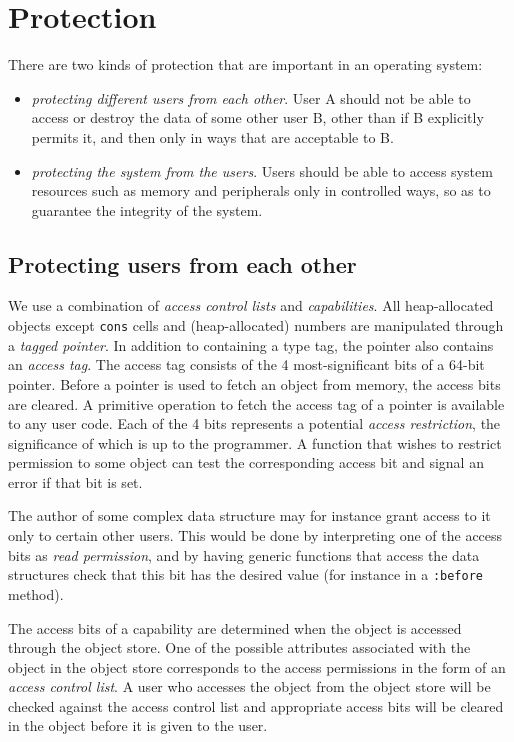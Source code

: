 \chapter{Protection}
\label{chap-protection}

There are two kinds of protection that are important in an operating
system:

\begin{itemize}
\item \emph{protecting different users from each other}.  User A
  should not be able to access or destroy the data of some other user
  B, other than if B explicitly permits it, and then only in ways that
  are acceptable to B.
\item \emph{protecting the system from the users}.  Users should be
  able to access system resources such as memory and peripherals only
  in controlled ways, so as to guarantee the integrity of the system.
\end{itemize}

\section{Protecting users from each other}

We use a combination of \emph{access control lists} and
\emph{capabilities}.  All heap-allocated objects except \texttt{cons}
cells and (heap-allocated) numbers are manipulated through a
\emph{tagged pointer}.  In addition to containing a type tag, the
pointer also contains an \emph{access tag}.  The access tag consists
of the 4 most-significant bits of a 64-bit pointer.  Before a pointer
is used to fetch an object from memory, the access bits are cleared.
A primitive operation to fetch the access tag of a pointer is
available to any user code.  Each of the 4 bits represents a potential
\emph{access restriction}, the significance of which is up to the
programmer.  A function that wishes to restrict permission to some
object can test the corresponding access bit and signal an error if
that bit is set.

The author of some complex data structure may for instance grant
access to it only to certain other users.  This would be done by
interpreting one of the access bits as \emph{read permission}, and by
having generic functions that access the data structures check that
this bit has the desired value (for instance in a \texttt{:before}
method). 

The access bits of a capability are determined when the object is
accessed through the object store.   One of
the possible attributes associated with the object in the object store
corresponds to the access permissions in the form of an \emph{access
  control list}.  A user who accesses the object from the object store
will be checked against the access control list and appropriate access
bits will be cleared in the object before it is given to the user.

